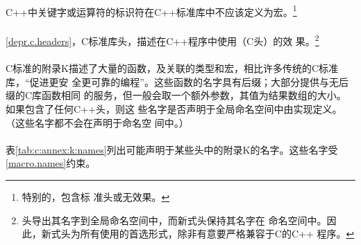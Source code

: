 \paragraph{}
C++中关键字或运算符的标识符在C++标准库中不应该定义为宏。\footnote{特别的，包含标
准头或无效果。}

\paragraph{}
\ref{depr.c.headers}，C标准库头，描述在C++程序中使用（C头）的效
果。\footnote{头导出其名字到全局命名空间中，而新式头保持其名字在
命名空间中。因此，新式头为所有使用的首选形式，除非有意要严格兼容于C的C++
程序。}

\paragraph{}
C标准的附录K描述了大量的函数，及关联的类型和宏，相比许多传统的C标准库，“促进更安
全更可靠的编程”。这些函数的名字具有后缀；大部分提供与无后缀的C库函数相同
的服务，但一般会取一个额外参数，其值为结果数组的大小。如果包含了任何C++头，则这
些名字是否声明于全局命名空间中由实现定义。（这些名字都不会在声明于命名空
间中。）

\paragraph{}
表\ref{tab:c:annex:k:names}列出可能声明于某些头中的附录K的名字。这些名字受
\ref{macro.names}约束。

